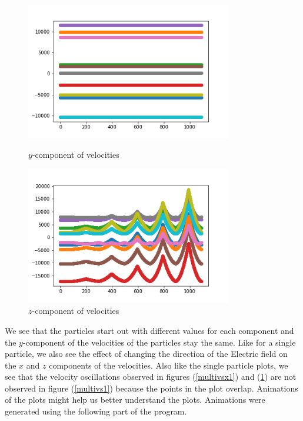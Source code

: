 \documentclass[12pt]{article}
\begin{document}
\begin{figure}[H]
	\begin{multicols}{2}
		\includegraphics[width=\linewidth, height=6cm]{multivsy1.png} \caption{$y$-component of velocities} \label{multivsy1} \par
		\includegraphics[width=\linewidth, height=6cm]{multivsz1.png} \caption{$z$-component of velocities} \label{multivsz1} \par
	\end{multicols}
\end{figure}	
	
	We see that the particles start out with different values for each component and the $y$-component of the velocities of the particles stay the same. Like for a single particle, we also see the effect of changing the direction of the Electric field on the $x$ and $z$ components of the velocities. Also like the single particle plots, we see that the velocity oscillations observed in figures (\ref{multivsx1}) and (\ref{multivsz1}) are not observed in figure (\ref{multivs1}) because the points in the plot overlap. Animations of the plots might help us better understand the plots. Animations were generated using the following part of the program.
	
\end{document}
